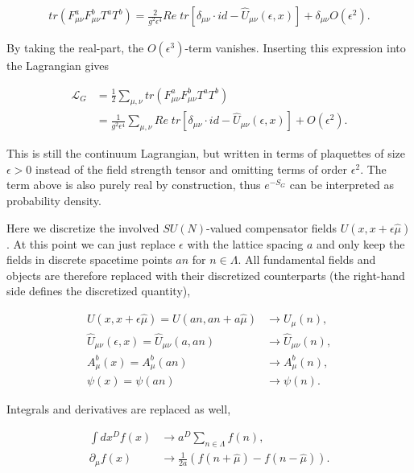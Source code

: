 \documentclass{article}
\theoremstyle{plain} %
\theoremstyle{convention} %
\theoremstyle{remark} %
\numberwithin{equation}{section}
\begin{document}
\begin{align*}
    tr( F_{\mu \nu}^a F_{\mu \nu}^b T^a T^b) = \frac{2}{g^2 \epsilon^4} Re \; tr\left[ \delta_{\mu \nu} \cdot id - \hat{U}_{\mu \nu}(\epsilon,x) \right] + \delta_{\mu \nu} O(\epsilon^{2}).
\end{align*}

 By taking the real-part, the $O(\epsilon^3)$-term vanishes. Inserting this expression into the Lagrangian gives

\begin{align*}
    \mathcal{L}_G &= \frac{1}{2} \sum_{\mu, \nu} tr( F_{\mu \nu}^a F_{\mu \nu}^b T^a T^b) \\
    &= \frac{1}{g^2 \epsilon^4} \sum_{\mu, \nu} Re \; tr\left[ \delta_{\mu \nu} \cdot id - \hat{U}_{\mu \nu}(\epsilon,x) \right] + O(\epsilon^{2}).
\end{align*}

This is still the continuum Lagrangian, but written in terms of plaquettes of size $\epsilon > 0$ instead of the field strength tensor and omitting terms of order $\epsilon^2$. The term above is also purely real by construction, thus $e^{-S_G}$ can be interpreted as probability density.

Here we discretize the involved $SU(N)$-valued compensator fields $U(x,x+\epsilon \hat{\mu})$. At this point we can just replace $\epsilon$ with the lattice spacing $a$ and only keep the fields in discrete spacetime points $an$ for $n \in \Lambda$. All fundamental fields and objects are therefore replaced with their discretized counterparts (the right-hand side defines the discretized quantity),

\begin{align*}
    U(x,x + \epsilon \hat{\mu}) = U(an,an + a\hat{\mu}) &\longrightarrow U_{\mu}(n), \\
    \hat{U}_{\mu \nu}(\epsilon, x) = \hat{U}_{\mu \nu}(a, an) &\longrightarrow \hat{U}_{\mu \nu}(n), \\
    A_{\mu}^b(x) = A_{\mu}^b(an) &\longrightarrow A_{\mu}^b(n), \\
    \psi(x) = \psi(an) &\longrightarrow \psi(n).
\end{align*}

Integrals and derivatives are replaced as well,

\begin{align*}
    \int dx^D f(x) &\longrightarrow a^D \sum_{n \in \Lambda} f(n), \\
    \partial_{\mu} f(x) &\longrightarrow \frac{1}{2a} \left( f(n+\hat{\mu}) - f(n-\hat{\mu}) \right).
\end{align*}
\end{document}
